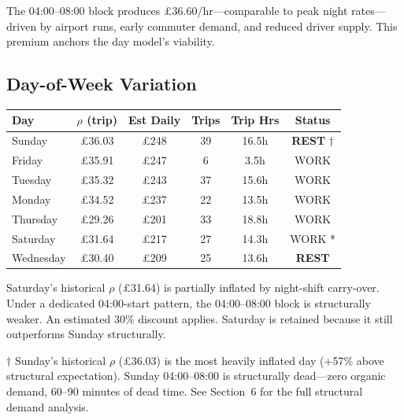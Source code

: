 \documentclass[a4paper,11pt]{article}
\begin{document}
\medskip
The 04:00--08:00 block produces \pounds36.60/hr---comparable to peak night rates---driven by airport runs, early commuter demand, and reduced driver supply. This premium anchors the day model's viability.

\subsection{Day-of-Week Variation}

\begin{tabularx}{\textwidth}{l C C C C C}
\toprule
\textbf{Day} & \textbf{$\rho$ (trip)} & \textbf{Est Daily} & \textbf{Trips} & \textbf{Trip Hrs} & \textbf{Status} \\
\midrule
Sunday & \pounds36.03 & \pounds248 & 39 & 16.5h & \textbf{REST} $\dagger$ \\
Friday & \pounds35.91 & \pounds247 & 6 & 3.5h & WORK \\
Tuesday & \pounds35.32 & \pounds243 & 37 & 15.6h & WORK \\
Monday & \pounds34.52 & \pounds237 & 22 & 13.5h & WORK \\
Thursday & \pounds29.26 & \pounds201 & 33 & 18.8h & WORK \\
Saturday & \pounds31.64 & \pounds217 & 27 & 14.3h & WORK * \\
Wednesday & \pounds30.40 & \pounds209 & 25 & 13.6h & \textbf{REST} \\
\bottomrule
\end{tabularx}

\medskip
{\small * Saturday's historical $\rho$ (\pounds31.64) is partially inflated by night-shift carry-over. Under a dedicated 04:00-start pattern, the 04:00--08:00 block is structurally weaker. An estimated 30\% discount applies. Saturday is retained because it still outperforms Sunday structurally.}

{\small $\dagger$ Sunday's historical $\rho$ (\pounds36.03) is the most heavily inflated day (+57\% above structural expectation). Sunday 04:00--08:00 is structurally dead---zero organic demand, 60--90 minutes of dead time. See Section~6 for the full structural demand analysis.}

\newpage

\end{document}
